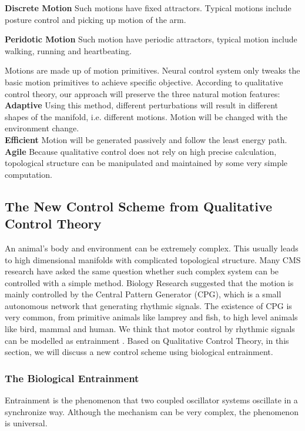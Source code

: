 \textbf{Discrete Motion}
Such motions have fixed attractors. Typical motions include posture control and picking up motion of the arm.

\textbf{Peridotic Motion}
Such motion have periodic attractors, typical motion include walking, running and heartbeating.

Motions are made up of motion primitives. Neural control system only tweaks the basic motion primitives to achieve specific objective. According to qualitative control theory, our approach will preserve the three natural motion features:\\
\textbf{Adaptive}
Using this method, different perturbations will result in different shapes of the manifold, i.e. different motions. Motion will be changed with the environment change.\\
\textbf{Efficient}
Motion will be generated passively and follow the least energy path.\\
\textbf{Agile}
Because qualitative control does not rely on high precise calculation, topological structure can be manipulated and maintained by some very simple computation.

\subsection{The New Control Scheme from Qualitative Control Theory}
An animal's body and environment can be extremely complex. This usually leads to high dimensional manifolds with complicated topological structure. Many CMS research have asked the same question whether such complex system can be controlled with a simple method. Biology Research suggested that the motion is mainly controlled by the Central Pattern Generator (CPG), which is a small autonomous network that generating rhythmic signals. The existence of CPG is very common, from primitive animals like lamprey and fish, to high level animals like bird, mammal and human\citep{Cohen1988}. We think that motor control by rhythmic signals can be modelled as entrainment \citep{Gonz'alez-Miranda2004}. Based on Qualitative Control Theory, in this section, we will discuss a new control scheme using biological entrainment.


\subsubsection{The Biological Entrainment}
Entrainment is the phenomenon that two coupled oscillator systems oscillate in a synchronize way. Although the mechanism can be very complex, the phenomenon is universal.  

